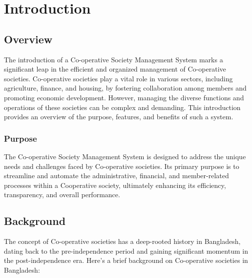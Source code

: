 

\chapter{Introduction}

\section{Overview}
The introduction of a Co-operative Society Management System marks a significant leap
in the efficient and organized management of Co-operative societies. Co-operative
societies play a vital role in various sectors, including agriculture, finance, and housing,
by fostering collaboration among members and promoting economic development.
However, managing the diverse functions and operations of these societies can be
complex and demanding. This introduction provides an overview of the purpose, features,
and benefits of such a system.

\subsection{Purpose}
The Co-operative Society Management System is designed to address the unique needs
and challenges faced by Co-operative societies. Its primary purpose is to streamline and automate the administrative, financial, and member-related processes within a Cooperative society, ultimately enhancing its efficiency, transparency, and overall
performance.








\section{Background}
The concept of Co-operative societies has a deep-rooted history in Bangladesh, dating back to the pre-independence period and gaining significant momentum in the post-independence era. Here's a brief background on Co-operative societies in Bangladesh: 

